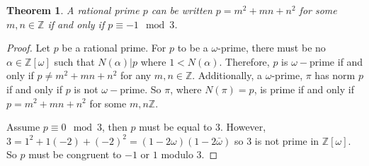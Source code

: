 \documentclass[12pt]{amsart}
\newtheorem{theorem}{Theorem}
\theoremstyle{definition}
\theoremstyle{remark}
\begin{document}
\begin{theorem}
    A rational prime $p$ can be written $p=m^2+mn+n^2$ for some $m,n\in\mathbb{Z}$ if and only if $p\equiv -1 \mod{3}$.
\end{theorem}
\begin{proof}
    Let $p$ be a rational prime. For $p$ to be a $\omega$-prime, there must be no $\alpha\in\mathbb{Z}[\omega]$ such that $N(\alpha)|p$ where $1<N(\alpha)$. Therefore, $p$ is $\omega-$prime if and only if $p\not=m^2+mn+n^2$ for any $m,n\in\mathbb{Z}$. Additionally, a $\omega$-prime, $\pi$ has norm $p$ if and only if $p$ is not $\omega-$prime. So $\pi$, where $N(\pi)=p$, is prime if and only if $p=m^2+mn+n^2$ for some $m,n\mathbb{Z}$. 
    
    Assume $p\equiv 0\mod{3}$, then $p$ must be equal to 3. However, $3=1^2 + 1(-2) + (-2)^2 = (1-2\omega)(1-2\bar{\omega})$ so 3 is not prime in $\mathbb{Z}[\omega]$. So $p$ must be congruent to $-1$ or $1$ modulo $3$.
    

\end{proof}
\end{document}
